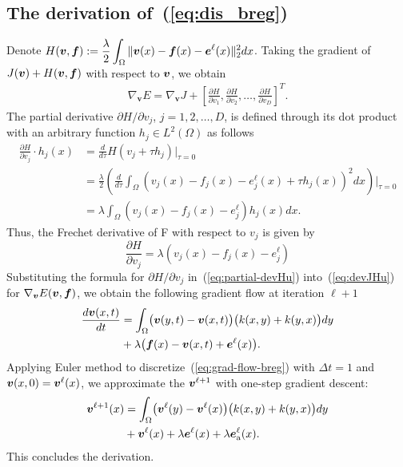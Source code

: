 \subsection{The derivation of~(\ref{eq:dis_breg})}
\label{secapp:grad-flow-breg}
Denote $H({\bm v}, {\bm f}) :=\displaystyle \frac{\lambda}{2} \int_{\Omega} \|{\bm v}(x) - {\bm f}(x) - \bm{e}^{\ell}(x)\|_2^2 dx$. 
 Taking the gradient of $J({\bm v}) + H({\bm v}, {\bm f})$ with respect to ${\bm v}$, we obtain
\begin{align}
\label{eq:devJHu}
    \nabla_{\bm{v}}E = \nabla_{\bm{v}}J + 
    \left[\frac{\partial H}{\partial v_1}, \frac{\partial H}{\partial v_2}, \dots, \frac{\partial H}{\partial v_{D}} \right]^T.
\end{align}
The partial derivative ${\partial H}/{\partial v_j}$, $j = 1, 2, \dots, D$, is defined through its dot product with an arbitrary function $h_j \in L^{2}(\Omega)$ as follows
\begin{align}
\frac{\partial H}{\partial v_j}\cdot h_j(x) &= \frac{d}{d\tau}H(v_j + \tau h_j)\bigl|_{\tau=0} \nonumber\\
&= \frac{\lambda}{2} \left(\frac{d}{d\tau} \int_{\Omega} (v_j(x) - f_j(x) - e^{\ell}_j(x) + \tau h_j(x))^2 dx \right)\biggl|_{\tau=0}  \nonumber\\
&= \lambda \int_{\Omega} (v_j(x) - f_j(x) -e^{\ell}_j)h_j(x)  dx  \nonumber.
\end{align}
Thus, the Frechet derivative of F with respect to $v_j$ is given by
\begin{equation}
\label{eq:partial-devHu}
\frac{\partial H}{\partial v_j} = \lambda (v_j(x) - f_j(x) - e^{\ell}_j)
\end{equation}
Substituting the formula for ${\partial H}/{\partial v_j}$ in~(\ref{eq:partial-devHu}) into~(\ref{eq:devJHu}) for $\nabla_{{\bm v}}E({\bm v}, {\bm f})$, we obtain the following gradient flow 
at iteration $\ell + 1$ 
\begin{equation}
\begin{aligned}
   \label{eq:grad-flow-breg}
        \displaystyle\frac{d{\bm v}(x, t)}{dt} &= \int_{\Omega} \bigl(\bm{v}(y,t) - \bm{v}(x,t) \bigl)\bigl(k(x, y) + k(y,x)\bigl)dy \\
        &+ \lambda \bigl({\bm f}(x) - {\bm v}(x, t) + \bm{e}^{\ell}(x)\bigl).
\end{aligned}
\end{equation}
Applying Euler method to discretize~(\ref{eq:grad-flow-breg}) with $\Delta t = 1$ and ${\bm v}(x, 0) = {\bm v}^{\ell}(x)$, we approximate the ${\bm v}^{\ell + 1}$ with one-step gradient descent:
\begin{equation}
\begin{aligned}
\nonumber
   {\bm v}^{\ell + 1}(x) 
   &= \int_{\Omega} \bigl(\bm{v}^{\ell}(y) - \bm{v}^{\ell}(x) \bigl)\bigl(k(x, y) + k(y,x)\bigl)dy \\
   & + {\bm v}^{\ell}(x) + \lambda \bm{e}^{\ell}(x) + \lambda\bm{e}^{\ell}_{\mathrm{a}}(x).
\end{aligned}
\end{equation}
This concludes the derivation.

